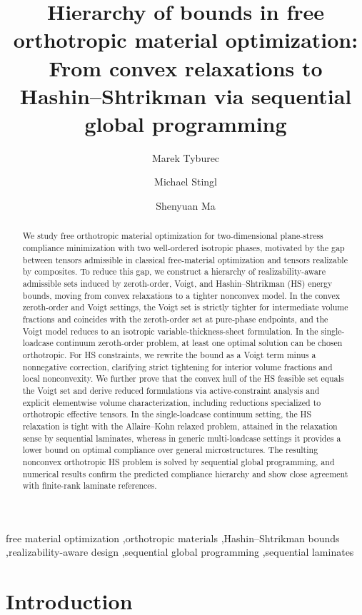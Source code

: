 \documentclass[preprint,3p]{elsarticle}
\title{Hierarchy of bounds in free orthotropic material optimization: From convex relaxations to Hashin--Shtrikman via sequential global programming}
\author[inst1]{Marek Tyburec\corref{cor1}}
\author[inst2]{Michael Stingl}
\author[inst3]{Shenyuan Ma}
\date{}
\begin{document}
\begin{frontmatter}

\begin{abstract}
We study free orthotropic material optimization for two-dimensional plane-stress compliance minimization with two well-ordered isotropic phases, motivated by the gap between tensors admissible in classical free-material optimization and tensors realizable by composites. To reduce this gap, we construct a hierarchy of realizability-aware admissible sets induced by zeroth-order, Voigt, and Hashin--Shtrikman (HS) energy bounds, moving from convex relaxations to a tighter nonconvex model. In the convex zeroth-order and Voigt settings, the Voigt set is strictly tighter for intermediate volume fractions and coincides with the zeroth-order set at pure-phase endpoints, and the Voigt model reduces to an isotropic variable-thickness-sheet formulation. In the single-loadcase continuum zeroth-order problem, at least one optimal solution can be chosen orthotropic. For HS constraints, we rewrite the bound as a Voigt term minus a nonnegative correction, clarifying strict tightening for interior volume fractions and local nonconvexity. We further prove that the convex hull of the HS feasible set equals the Voigt set and derive reduced formulations via active-constraint analysis and explicit elementwise volume characterization, including reductions specialized to orthotropic effective tensors. In the single-loadcase continuum setting, the HS relaxation is tight with the Allaire--Kohn relaxed problem, attained in the relaxation sense by sequential laminates, whereas in generic multi-loadcase settings it provides a lower bound on optimal compliance over general microstructures. The resulting nonconvex orthotropic HS problem is solved by sequential global programming, and numerical results confirm the predicted compliance hierarchy and show close agreement with finite-rank laminate references.
\end{abstract}

\begin{keyword}
free material optimization \sep orthotropic materials \sep Hashin--Shtrikman bounds \sep realizability-aware design \sep sequential global programming \sep sequential laminates
\end{keyword}

\end{frontmatter}

\section{Introduction}
\end{document}
